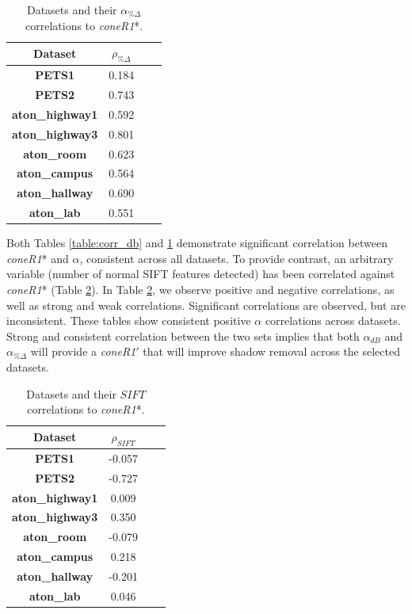 \begin{table}
\centering
\caption{Datasets and their $\alpha_{\%\Delta}$ correlations to \textit{coneR1}*.}
\begin{tabular}{ |c|c|c|c| }
	\hline
	\textbf{Dataset} & \textbf{$\rho_{\%\Delta}$} \\
	\hline
	\hline
	\textbf{PETS1} & 0.184 \\
	\hline
	\textbf{PETS2} & 0.743 \\
	\hline
	\textbf{aton\_highway1} & 0.592 \\
	\hline
	\textbf{aton\_highway3} & 0.801 \\
	\hline
	\textbf{aton\_room} & 0.623 \\
	\hline
	\textbf{aton\_campus} & 0.564 \\
	\hline
	\textbf{aton\_hallway} & 0.690 \\
	\hline
	\textbf{aton\_lab} & 0.551 \\
	\hline
\end{tabular}

\label{table:corr_rgb}
\end{table}

Both Tables \ref{table:corr_db} and \ref{table:corr_rgb} demonstrate significant correlation between \textit{coneR1}* and $\alpha$, consistent across all datasets. To provide contrast, an arbitrary variable (number of normal SIFT features detected) has been correlated against \textit{coneR1}* (Table \ref{table:bad_corr}). In Table \ref{table:bad_corr}, we observe positive and negative correlations, as well as strong and weak correlations.  Significant correlations are observed, but are inconsistent. These tables show consistent positive $\alpha$ correlations across datasets. Strong and consistent correlation between the two sets implies that both $\alpha_{dB}$ and $\alpha_{\%\Delta}$ will provide a \textit{coneR1}$'$ that will improve shadow removal across the selected datasets.

\begin{table}
\centering
\caption{Datasets and their $SIFT$ correlations to \textit{coneR1}*.}
\begin{tabular}{ |c|c|c|c| }
	\hline
	\textbf{Dataset} & \textbf{$\rho_{SIFT}$} \\
	\hline
	\hline
	\textbf{PETS1} & -0.057 \\
	\hline
	\textbf{PETS2} & -0.727 \\
	\hline
	\textbf{aton\_highway1} & 0.009 \\
	\hline
	\textbf{aton\_highway3} & 0.350 \\
	\hline
	\textbf{aton\_room} & -0.079 \\
	\hline
	\textbf{aton\_campus} & 0.218 \\
	\hline
	\textbf{aton\_hallway} & -0.201 \\
	\hline
	\textbf{aton\_lab} & 0.046 \\
	\hline
\end{tabular}

\label{table:bad_corr}
\end{table}

